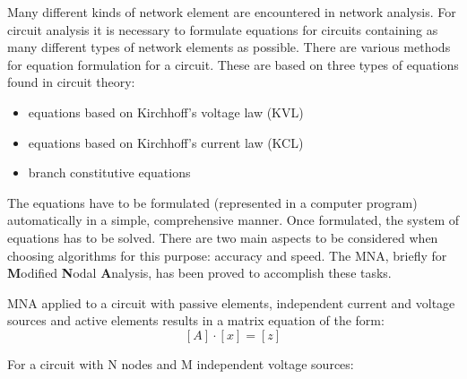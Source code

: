 \documentclass[10pt]{report}
\begin{document}
Many different kinds of network element are encountered in network
analysis.  For circuit analysis it is necessary to formulate equations
for circuits containing as many different types of network elements as
possible.  There are various methods for equation formulation for a
circuit.  These are based on three types of equations found in circuit
theory:

\begin{itemize}
\item equations based on Kirchhoff's voltage law (KVL)
\item equations based on Kirchhoff's current law (KCL)
\item branch constitutive equations
\end{itemize}

The equations have to be formulated (represented in a computer
program) automatically in a simple, comprehensive manner.  Once
formulated, the system of equations has to be solved.  There are two
main aspects to be considered when choosing algorithms for this
purpose: accuracy and speed.  The MNA, briefly for \textbf{M}odified
\textbf{N}odal \textbf{A}nalysis, has been proved to accomplish these
tasks.

MNA applied to a circuit with passive elements, independent current
and voltage sources and active elements results in a matrix equation
of the form:
\begin{equation}
\left[A\right] \cdot \left[x\right] = \left[z\right]
\end{equation}

For a circuit with N nodes and M independent voltage sources:
\end{document}
